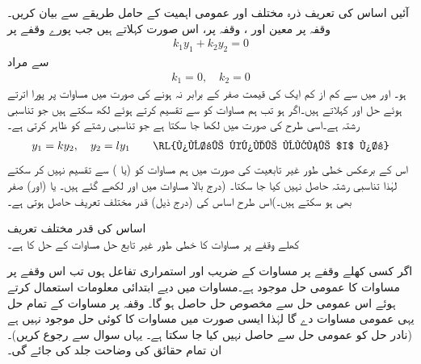 آئیں اساس کی تعریف ذرہ مختلف اور عمومی اہمیت کے حامل طریقے سے بیان کریں۔  وقفہ  پر معین  اور ، وقفہ   پر، اس صورت  کہلاتے ہیں جب پورے وقفے پر
\begin{align}\label{مساوات_سادہ_دو_درجی_خطی_طور_غیر_تابع_الف}
k_1 y_1+k_2 y_2=0
\end{align}
سے مراد 
\begin{align}
k_1=0, \quad k_2=0
\end{align}
ہو۔ اور  میں سے کم از کم ایک کی قیمت صفر کے برابر نہ ہونے کی صورت میں مساوات  پر پورا اترتے ہوئے حل  اور   کہلاتے ہیں۔اگر  ہو تب ہم مساوات  کو  سے تقسیم کرتے ہوئے  لکھ سکتے ہیں جو تناسبی رشتہ ہے۔اسی طرح  کی صورت میں  لکھا جا سکتا ہے جو تناسبی رشتے کو ظاہر کرتی ہے۔
\begin{align}
y_1=k y_2,\quad y_2=l y_1 \quad \quad  \text{\RL{پورے کھلے وقفے $I$ پر}}
\end{align}
اس کے برعکس خطی طور غیر تابعیت کی صورت میں ہم مساوات  کو  (یا ) سے تقسیم نہیں کر سکتے لہٰذا  تناسبی رشتہ حاصل نہیں کیا جا سکتا۔ (درج بالا مساوات میں  اور  لکھے گئے ہیں۔ یا (اور)  صفر بھی ہو سکتے ہیں۔)اس طرح اساس کی (درج ذیل) قدر مختلف تعریف حاصل ہوتی ہے۔

\quad اساس کی قدر مختلف تعریف\\
کھلے وقفے  پر مساوات  کا خطی طور غیر تابع حل   مساوات  کے حل کا  ہے۔

اگر کسی کھلے وقفے  پر  مساوات  کے   ضریب   اور  استمراری تفاعل ہوں تب اس وقفے پر مساوات   کا عمومی حل موجود ہے۔مساوات  میں دیے ابتدائی معلومات استعمال کرتے ہوئے اس عمومی حل سے  مخصوص حل حاصل ہو گا۔ وقفہ  پر مساوات  کے تمام حل یہی عمومی مساوات دے گا لہٰذا ایسی صورت میں مساوات کا کوئی  حل موجود نہیں ہے (نادر حل کو عمومی حل سے حاصل نہیں کیا جا سکتا ہے۔ یہاں سوال  سے رجوع کریں)۔ ان تمام حقائق کی وضاحت جلد کی جائے گی۔


